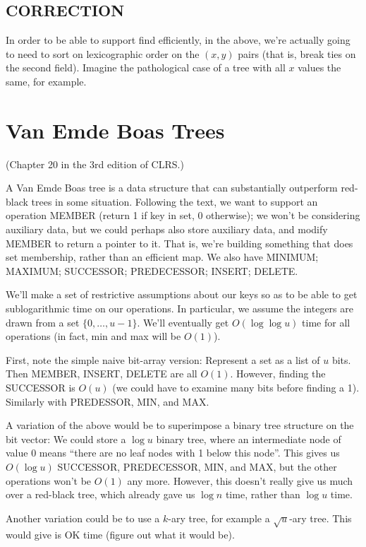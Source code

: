 \documentclass{article}
\begin{document}
\subsection{CORRECTION}

In order to be able to support find efficiently, in the above, we're actually
going to need to sort on lexicographic order on the $(x,y)$ pairs (that is,
break ties on the second field).
Imagine the pathological case of a tree with all $x$ values the same, for
example.


\section{Van Emde Boas Trees}

(Chapter 20 in the 3rd edition of CLRS.)

A Van Emde Boas tree is a data structure that can substantially outperform
red-black trees in some situation.
Following the text, we want to support an operation MEMBER (return 1 if
key in set, 0 otherwise); we won't be considering auxiliary data,
but we could perhaps also store auxiliary data, and modify MEMBER to return a 
pointer to it.
That is, we're building something that does set membership, rather than
an efficient map.
We also have MINIMUM; MAXIMUM; SUCCESSOR; PREDECESSOR;
INSERT; DELETE.

We'll make a set of restrictive assumptions about our keys so as to be able to 
get sublogarithmic time on our operations.
In particular, we assume the integers are drawn from a set $\{0,\ldots,u-1\}$.
We'll eventually get $O(\log\log u)$ time for all operations (in fact,
min and max will be $O(1)$).

First, note the simple naive bit-array version: Represent a set as a list of
$u$ bits. Then
MEMBER, INSERT, DELETE are all $O(1)$.
However, finding the SUCCESSOR is $O(u)$ (we could have to examine many bits
before finding a 1).
Similarly with PREDESSOR, MIN, and MAX.

A variation of the above would be to superimpose a binary tree structure
on the bit vector: We could store a $\log u$ binary tree, where
an intermediate node of value 0 means ``there are no leaf nodes with 1 below
this node''.
This gives us $O(\log u)$ SUCCESSOR, PREDECESSOR, MIN, and MAX, but
the other operations won't be $O(1)$ any more.
However, this doesn't really give us much over a red-black tree, which
already gave us $\log n$ time, rather than $\log u$ time.

Another variation could be to use a $k$-ary tree, for example a
$\sqrt u$-ary tree.
This would give is OK time (figure out what it would be).
\end{document}
